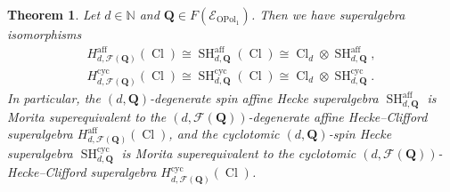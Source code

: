 \documentclass[11pt]{amsart}
\newtheorem{theo}{Theorem}[section]
\theoremstyle{definition}
\numberwithin{equation}{section}
\begin{document}
\begin{theo} \label{Morita_result}
Let $ d \in \mathbb{N} $ and $ \mathbf{Q} \in F(\mathcal{E}_{\operatorname{OPol}_{1}}) $. Then we have superalgebra isomorphisms
\begin{align}
H_{d,\mathcal{F}(\mathbf{Q})}^{\operatorname{aff}}(\operatorname{Cl}) \cong \operatorname{SH}^{\operatorname{aff}}_{d,\mathbf{Q}}(\operatorname{Cl}) \cong \operatorname{Cl}_{d} \otimes \operatorname{SH}^{\operatorname{aff}}_{d,\mathbf{Q}}, \label{isomorphism_123}
\\ H_{d,\mathcal{F}(\mathbf{Q})}^{\operatorname{cyc}}(\operatorname{Cl}) \cong \operatorname{SH}^{\operatorname{cyc}}_{d,\mathbf{Q}}(\operatorname{Cl}) \cong \operatorname{Cl}_{d} \otimes \operatorname{SH}^{\operatorname{cyc}}_{d,\mathbf{Q}}. \label{isomorphism_223}
\end{align}
In particular, the $ (d,\mathbf{Q}) $-degenerate spin affine Hecke superalgebra $ \operatorname{SH}^{\operatorname{aff}}_{d,\mathbf{Q}} $ is Morita superequivalent to the $ (d,\mathcal{F}(\mathbf{Q})) $-degenerate affine Hecke--Clifford superalgebra $ H_{d,\mathcal{F}(\mathbf{Q})}^{\operatorname{aff}}(\operatorname{Cl}) $, and the cyclotomic $ (d,\mathbf{Q}) $-spin Hecke superalgebra $ \operatorname{SH}^{\operatorname{cyc}}_{d,\mathbf{Q}} $ is Morita superequivalent to the cyclotomic $ (d,\mathcal{F}(\mathbf{Q})) $-Hecke--Clifford superalgebra $ H_{d,\mathcal{F}(\mathbf{Q})}^{\operatorname{cyc}}(\operatorname{Cl}) $.
\end{theo}
\end{document}

